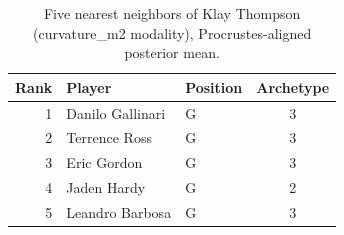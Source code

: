 \begin{table}[htbp]
  \centering\small
  \begin{tabular}{rllc}
    \toprule
    Rank & Player & Position & Archetype \\
    \midrule
    1 & Danilo Gallinari & G & 3 \\
    2 & Terrence Ross & G & 3 \\
    3 & Eric Gordon & G & 3 \\
    4 & Jaden Hardy & G & 2 \\
    5 & Leandro Barbosa & G & 3 \\
    \bottomrule
  \end{tabular}
  \caption{Five nearest neighbors of Klay Thompson (curvature_m2 modality), Procrustes-aligned posterior mean.}
  \label{tab:Klay_Thompson_neighbors_curvature_m2}
\end{table}

